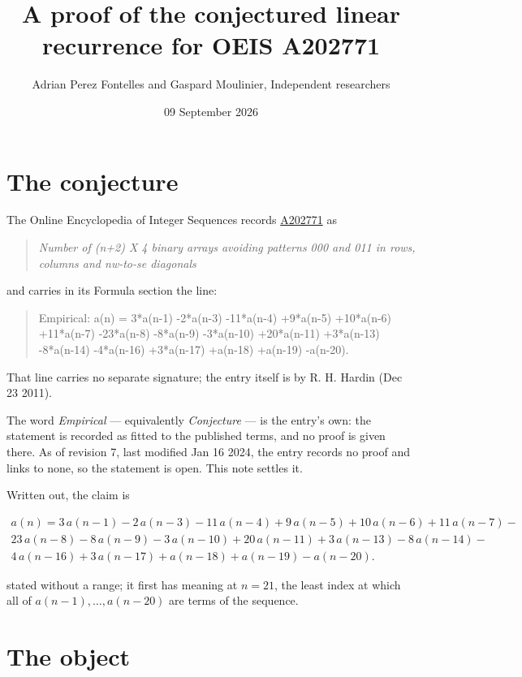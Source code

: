\documentclass[11pt]{article}
\title{A proof of the conjectured linear recurrence for OEIS A202771}
\author{Adrian Perez Fontelles and Gaspard Moulinier, Independent researchers}
\date{09 September 2026}
\theoremstyle{definition}
\begin{document}
\maketitle
\section{The conjecture}

The Online Encyclopedia of Integer Sequences records \href{https://oeis.org/A202771}{A202771} as

\begin{quote}\itshape Number of (n+2) X 4 binary arrays avoiding patterns 000 and 011 in rows, columns and nw-to-se diagonals\end{quote}

and carries in its Formula section the line:

\begin{quote}\ttfamily Empirical: a(n) = 3*a(n-1) -2*a(n-3) -11*a(n-4) +9*a(n-5) +10*a(n-6) +11*a(n-7) -23*a(n-8) -8*a(n-9) -3*a(n-10) +20*a(n-11) +3*a(n-13) -8*a(n-14) -4*a(n-16) +3*a(n-17) +a(n-18) +a(n-19) -a(n-20).\end{quote}

That line carries no separate signature; the entry itself is by R. H. Hardin (Dec 23 2011).

The word {\itshape Empirical} --- equivalently {\itshape Conjecture} --- is the entry's own: the statement is recorded as fitted to the published terms, and no proof is given there. As of revision 7, last modified Jan 16 2024, the entry records no proof and links to none, so the statement is open. This note settles it.

Written out, the claim is

\begin{multline*} a(n) = 3\,a(n-1) - 2\,a(n-3) - 11\,a(n-4) + 9\,a(n-5) + 10\,a(n-6) + 11\,a(n-7) - \\ 23\,a(n-8) - 8\,a(n-9) - 3\,a(n-10) + 20\,a(n-11) + 3\,a(n-13) - 8\,a(n-14) - \\ 4\,a(n-16) + 3\,a(n-17) + a(n-18) + a(n-19) - a(n-20). \end{multline*}

stated without a range; it first has meaning at $n = 21$, the least index at which all of $a(n-1),\dots,a(n-20)$ are terms of the sequence.

\section{The object}
\end{document}
